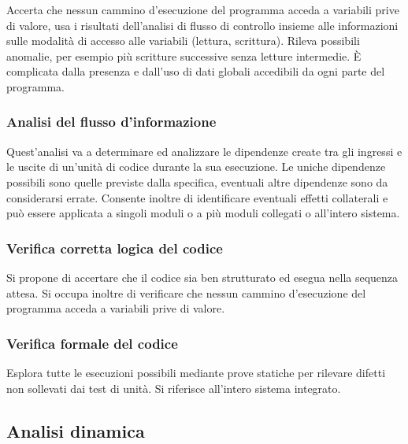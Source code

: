 Accerta che nessun cammino d'esecuzione del programma acceda a variabili prive
di valore, usa i risultati dell'analisi di flusso di controllo insieme alle
informazioni sulle modalit\`a di accesso alle variabili (lettura, scrittura).
Rileva possibili anomalie, per esempio pi\`u scritture successive senza letture
intermedie. \`E complicata dalla presenza e dall'uso di dati globali accedibili
da ogni parte del programma.

\subsubsection*{Analisi del flusso d'informazione}

Quest'analisi va a determinare ed analizzare le dipendenze create tra gli
ingressi e le uscite di un'unit\`a di codice durante la sua esecuzione. Le uniche
dipendenze possibili sono quelle previste dalla specifica, eventuali altre
dipendenze sono da considerarsi errate. Consente inoltre di identificare
eventuali effetti collaterali e pu\`o essere applicata a singoli moduli o a pi\`u
moduli collegati o all'intero sistema.

\subsubsection*{Verifica corretta logica del codice}

Si propone di accertare che il codice sia ben strutturato ed esegua nella
sequenza attesa. Si occupa inoltre di verificare che nessun cammino
d'esecuzione del programma acceda a variabili prive di valore.

\subsubsection*{Verifica formale del codice}

Esplora tutte le esecuzioni possibili mediante prove statiche per rilevare
difetti non sollevati dai test di unit\`a. Si riferisce all'intero sistema integrato.

\subsection{Analisi dinamica}
